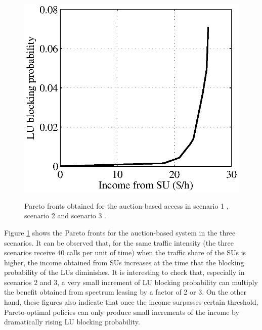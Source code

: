 \begin{figure}[h]
{\includegraphics[scale=0.4]{MDPauction1030.eps}
\label{fig:subfig3auction}
}
\caption[]{Pareto fronts obtained for the auction-based access in scenario 1 , scenario 2  and scenario 3 .}\label{fig:MDPauction}
\end{figure}

Figure \ref{fig:MDPauction} shows the Pareto fronts for the auction-based system in the three scenarios. It can be observed that, for the same traffic intensity (the three scenarios receive 40 calls per unit of time) when the traffic share of the SUs is higher, the income obtained from SUs increases at the time that the blocking probability of the LUs diminishes. It is interesting to check that, especially in scenarios 2 and 3, a very small increment of LU blocking probability can multiply the benefit obtained from spectrum leasing by a factor of 2 or 3. On the other hand, these figures also indicate that once the income surpasses certain threshold, Pareto-optimal policies can only produce small increments of the income by dramatically rising LU blocking probability.

